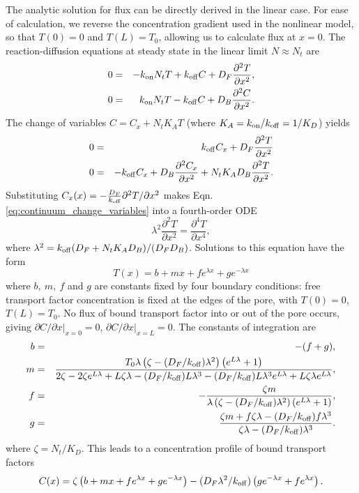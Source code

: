 The analytic solution for flux can be directly derived in the linear
case.  For ease of calculation, we reverse the concentration gradient
used in the nonlinear model, so that $T(0) = 0$ and $T(L) = T_0$, allowing
us to calculate flux at $x=0$.  The reaction-diffusion equations at steady state
in the linear limit $N \approx N_t$ are
\begin{eqnarray}
0 &=& -k_{\rm on} N_t T +k_{\rm off} C +D_F\frac{\partial^2 T}{\partial x^2},  \\ 
0 &=& k_{\rm on} N_tT -k_{\rm off} C + D_B \frac{\partial^2 C}{\partial x^2} .
\label{eq:continuum_linear} 
\end{eqnarray}
The change of variables $C = C_x + N_t K_A T$ (where $K_A =  k_{\rm on} / k_{\rm off}  = 1/K_D $) yields
\begin{eqnarray}
  0 &=& k_{\rm off} C_x +D_F\frac{\partial^2 T}{\partial x^2}   \\ 
  0 &=& -k_{\rm off} C_x  + D_B \frac{\partial^2 C_x}{\partial x^2} + N_t
        K_A  D_B \frac{\partial^2 T}{\partial x^2}.
\label{eq:continuum_change_variables} 
\end{eqnarray}
Substituting $C_x(x) = -\frac{D_F}{k_{\rm off}}\partial^2T/\partial x^2$
makes Eqn. \ref{eq:continuum_change_variables} into a fourth-order
ODE
\begin{equation}
  \lambda^2 \frac{\partial^2 T}{\partial x^2} =  \frac{\partial^4
    T}{\partial x^4}, 
\label{continuum} 
\end{equation} 
where $\lambda^2 = k_{\rm off}(D_F+ N_t K_A D_B)/(D_FD_B)$.  Solutions to
this equation have the form
$$T(x) = b + m x + f e^{\lambda x} + g e^{-\lambda x}$$ where
$b,\ m,\ f$ and $g$ are constants fixed by four boundary conditions:
free transport factor concentration is fixed at the edges of the pore, with
$T(0) = 0 $, $T(L)=T_0$. No flux of bound transport factor into or out of the pore
occurs, giving $\partial C/\partial x |_{x=0} =0$,
$\partial C/\partial x|_{x=L} = 0$.  The constants of integration are
\begin{eqnarray}
b&=& - (f+g),\\
m & =& \frac{T_0\lambda \left( \zeta -(D_F/k_{\rm off}) {\lambda}^2\right) \left(e^{L \lambda} + 1\right)}{2  \zeta - 2  \zeta e^{L \lambda} + L  \zeta \lambda -(D_F/k_{\rm off}) L {\lambda}^3 -(D_F/k_{\rm off}) L {\lambda}^3 e^{L \lambda} + L  \zeta \lambda e^{L \lambda}},\\
f &=& -\frac{ \zeta m}{\lambda \left( \zeta -(D_F/k_{\rm off}) {\lambda}^2\right) \left(e^{L \lambda} + 1\right)},\\
g &=& \frac{ \zeta m + f  \zeta \lambda- (D_F/k_{\rm off}) f {\lambda}^3 }{ \zeta \lambda -(D_F/k_{\rm off}) {\lambda}^3}.
\end{eqnarray}
where $\zeta = N_t/K_D$. This leads to a concentration profile of bound transport factors 
\begin{equation}
C(x) = \zeta \left(b + m x + f e^{\lambda x} + g e^{- \lambda
    x}\right) - (D_F{\lambda}^2/k_{\rm off})   \left(ge^{- \lambda x} + f
  e^{ \lambda x}\right). 
\end{equation}

